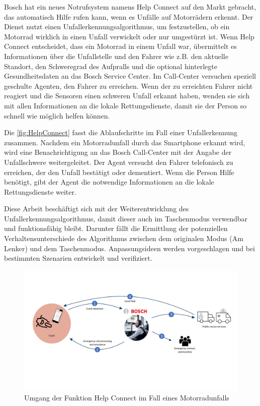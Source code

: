 Bosch hat ein neues Notrufsystem namens \glqq Help Connect\grqq{} auf den Markt gebracht, das automatisch Hilfe rufen kann, wenn es Unfälle auf Motorrädern erkennt.
Der Dienst nutzt einen Unfallerkennungsalgorithmus, um festzustellen, ob ein Motorrad wirklich in einen Unfall verwickelt oder nur umgestürzt ist.
Wenn \glqq Help Connect\grqq{} entscheidet, dass ein Motorrad in einem Unfall war, übermittelt es Informationen über die Unfallstelle und den Fahrer wie z.B. den aktuelle Standort, den Schweregrad des Aufpralls und die optional hinterlegte Gesundheitsdaten an das Bosch Service Center.
Im Call-Center versuchen speziell geschulte Agenten, den Fahrer zu erreichen. Wenn der zu erreichten Fahrer nicht reagiert und die Sensoren einen schweren Unfall erkannt haben, wenden sie sich mit allen Informationen an die lokale Rettungsdienste, damit sie der Person so schnell wie möglich helfen können.

Die \autoref{fig:HelpConnect} fasst die Ablaufschritte im Fall einer Unfallerkennung zusammen. Nachdem ein Motorradunfall durch das Smartphone erkannt wird, wird eine Benachrichtigung an das Bosch Call-Center mit der Angabe der Unfallschwere weitergeleitet. Der Agent versucht den Fahrer telefonisch zu erreichen, der den Unfall bestätigt oder dementiert. Wenn die Person Hilfe benötigt, gibt der Agent die notwendige Informationen an die lokale Rettungsdienste weiter.

Diese Arbeit beschäftigt sich mit der Weiterentwicklung des Unfallerkennungsalgorithmus, damit dieser auch im Taschenmodus verwendbar und funktionsfähig bleibt. Darunter fällt die Ermittlung der potenziellen Verhaltensunterschiede des Algorithmus zwischen dem originalen Modus (Am Lenker) und dem Taschenmodus. Anpassungsideen werden vorgeschlagen und bei bestimmten Szenarien entwickelt und verifiziert.

\begin{figure}
	\centering
	\includegraphics[width=\linewidth]{Bilder/HelpConnect.pdf}
	\caption{Umgang der Funktion \glqq Help Connect\grqq{} im Fall eines Motorradunfalls}
	\label{fig:HelpConnect}
\end{figure}













